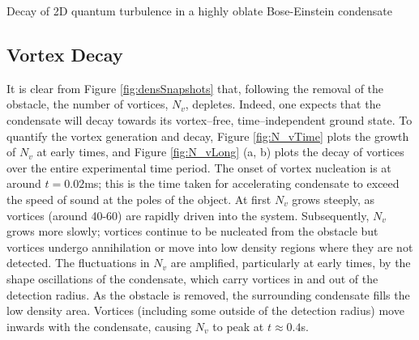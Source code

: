 \begin{chapter}{\label{cha:shin}Decay of 2D quantum turbulence in a highly oblate Bose-Einstein condensate}
\subsection{Vortex Decay}
It is clear from Figure \ref{fig:densSnapshots} that, following the removal 
of the obstacle, the number of vortices, $N_v$, depletes.   
Indeed, one expects that the condensate will decay towards its 
vortex--free, time--independent ground state.  To quantify the vortex generation and
decay, Figure \ref{fig:N_vTime} plots the growth of $N_v$ at early times, 
and Figure \ref{fig:N_vLong} (a, b) plots the decay of vortices over the entire experimental time period. 
The onset of vortex nucleation is at around $t=0.02$ms; 
this is the time taken for accelerating condensate to exceed the speed of 
sound at the poles of the object.
At first $N_v$ grows steeply, as vortices (around 40-60) are rapidly driven into the system. Subsequently, $N_v$ grows more slowly; vortices continue to be nucleated from the obstacle but vortices undergo annihilation or move into low density regions where they are not detected.  The fluctuations in $N_v$ are amplified, particularly at early times, by the shape oscillations of the condensate, which carry vortices in and out of the detection radius. As the obstacle is removed, the surrounding condensate fills the low density area. Vortices (including some outside of the detection radius) move inwards with the condensate, causing $N_v$ to peak at $t\approx 0.4$s.
\begin{figure}
\begin{center}
\begin{tikzpicture}

\end{tikzpicture}
\end{center}
\end{figure}
\end{chapter}
